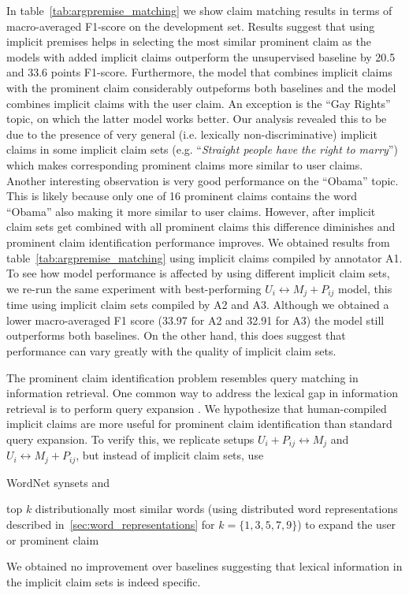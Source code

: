 In table~\ref{tab:argpremise_matching} we show claim matching results in terms of
macro-averaged F1-score on the development set. 
Results suggest that using implicit premises helps in selecting the most similar prominent claim 
as the models with added implicit claims outperform the unsupervised baseline by
20.5 and 33.6 points F1-score. 
Furthermore, the model that combines implicit claims with the prominent claim considerably 
outpeforms both baselines and the model combines implicit claims with the user claim. 
An exception is the ``Gay Rights'' topic, on which the latter model works better. 
Our analysis revealed this to be due to the presence of very general 
(i.e. lexically non-discriminative) implicit claims in some implicit claim sets 
(e.g. ``\emph{Straight people
have the right to marry}'') which makes corresponding prominent claims more similar to
user claims. 
Another interesting observation is very good performance on the ``Obama'' topic. 
This is likely because only one of 16 prominent claims contains the word ``Obama''
also making it more similar to user claims. 
However, after implicit claim sets get combined with all prominent claims this
difference diminishes and prominent claim identification performance improves. 
We obtained results from table~\ref{tab:argpremise_matching} using implicit claims compiled by
annotator A1. 
To see how model performance is affected by using different implicit claim
sets, we re-run the same experiment with best-performing $U_i \leftrightarrow
M_j + P_{ij}$ model, this time using implicit claim sets compiled by A2 and A3. 
Although we obtained a lower macro-averaged F1 score (33.97 for A2 and 32.91 for A3) the model 
still outperforms both baselines. 
On the other hand, this does suggest that performance can vary greatly with the quality of 
implicit claim sets. 


The prominent claim identification problem resembles query matching in
information retrieval. 
One common way to address the lexical gap in information retrieval is to perform
query expansion \citep{voorhees1994query}. 
We hypothesize that human-compiled implicit claims are more useful for prominent claim
identification than standard
query expansion. 
To verify this, we replicate setups $U_i + P_{ij} \leftrightarrow M_j$ and
$U_i \leftrightarrow M_j + P_{ij}$, but instead of implicit claim sets, use
\begin{enumerate*}[label=(\arabic*)]
\item WordNet \citep{miller1995wordnet} synsets and
\item top $k$ distributionally most similar words (using distributed
word representations described in~\ref{sec:word_representations} for $k=\{1, 3, 5, 7, 9\}$) to
expand the user or prominent claim 
\end{enumerate*}
We obtained no improvement over baselines suggesting that lexical information 
in the implicit claim sets is indeed specific. 


